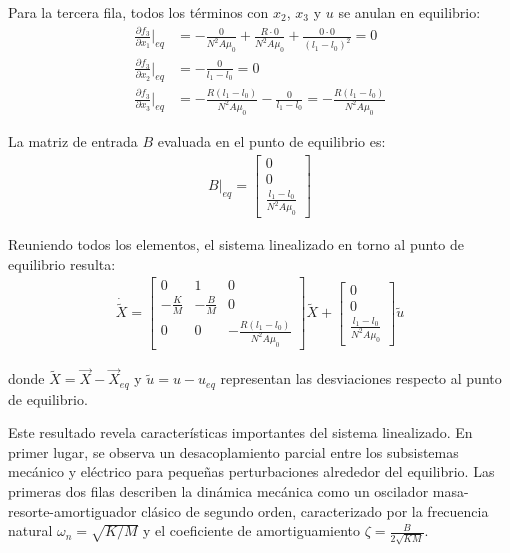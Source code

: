 \documentclass[
  11pt,
  letterpaper,
   addpoints,
   answers
  ]{exam}
\begin{document}
\begin{solution}
Para la tercera fila, todos los términos con $x_2$, $x_3$ y $u$ se anulan en equilibrio:
\begin{align}
\frac{\partial f_3}{\partial x_1}\Big|_{eq} &= -\frac{0}{N^2 A \mu_0} + \frac{R \cdot 0}{N^2 A \mu_0} + \frac{0 \cdot 0}{(l_1 - l_0)^2} = 0\\
\frac{\partial f_3}{\partial x_2}\Big|_{eq} &= -\frac{0}{l_1 - l_0} = 0\\
\frac{\partial f_3}{\partial x_3}\Big|_{eq} &= -\frac{R(l_1 - l_0)}{N^2 A \mu_0} - \frac{0}{l_1 - l_0} = -\frac{R(l_1 - l_0)}{N^2 A \mu_0}
\end{align}

La matriz de entrada $B$ evaluada en el punto de equilibrio es:
\begin{align}
B\Big|_{eq} = \begin{bmatrix}
0 \\[2pt] 0 \\[2pt] \displaystyle \frac{l_1 - l_0}{N^2 A \mu_0}
\end{bmatrix}
\end{align}

Reuniendo todos los elementos, el sistema linealizado en torno al punto de equilibrio resulta:
\begin{align}
\boxed{
\dot{\tilde{X}} = \begin{bmatrix}
0 & 1 & 0 \\[6pt]
-\displaystyle\frac{K}{M} & -\displaystyle\frac{B}{M} & 0 \\[6pt]
0 & 0 & -\displaystyle\frac{R(l_1 - l_0)}{N^2 A \mu_0}
\end{bmatrix} \tilde{X} + \begin{bmatrix}
0 \\[2pt] 0 \\[2pt] \displaystyle \frac{l_1 - l_0}{N^2 A \mu_0}
\end{bmatrix} \tilde{u}
}
\end{align}

donde $\tilde{X} = \vec{X} - \vec{X}_{eq}$ y $\tilde{u} = u - u_{eq}$ representan las desviaciones respecto al punto de equilibrio.

Este resultado revela características importantes del sistema linealizado. En primer lugar, se observa un desacoplamiento parcial entre los subsistemas mecánico y eléctrico para pequeñas perturbaciones alrededor del equilibrio. Las primeras dos filas describen la dinámica mecánica como un oscilador masa-resorte-amortiguador clásico de segundo orden, caracterizado por la frecuencia natural $\omega_n = \sqrt{K/M}$ y el coeficiente de amortiguamiento $\zeta = \frac{B}{2\sqrt{KM}}$. 


\end{solution}
\end{document}
